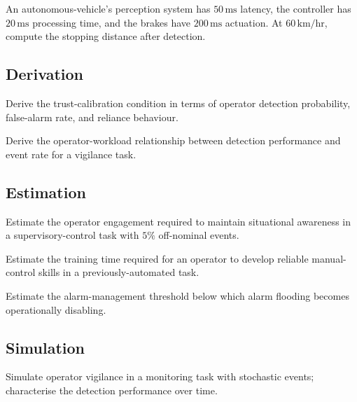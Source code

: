 \begin{exercise}
An autonomous-vehicle's perception system has $50\,\text{ms}$ latency, the controller has $20\,\text{ms}$ processing time, and the brakes have $200\,\text{ms}$ actuation. At $60\,\text{km/hr}$, compute the stopping distance after detection.
\end{exercise}

\subsection*{Derivation}

\begin{exercise}
Derive the trust-calibration condition in terms of operator detection probability, false-alarm rate, and reliance behaviour.
\end{exercise}

\begin{exercise}
Derive the operator-workload relationship between detection performance and event rate for a vigilance task.
\end{exercise}

\subsection*{Estimation}

\begin{exercise}
Estimate the operator engagement required to maintain situational awareness in a supervisory-control task with $5\%$ off-nominal events.
\end{exercise}

\begin{exercise}
Estimate the training time required for an operator to develop reliable manual-control skills in a previously-automated task.
\end{exercise}

\begin{exercise}
Estimate the alarm-management threshold below which alarm flooding becomes operationally disabling.
\end{exercise}

\subsection*{Simulation}

\begin{exercise}
Simulate operator vigilance in a monitoring task with stochastic events; characterise the detection performance over time.
\end{exercise}


